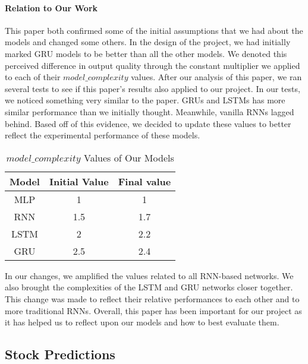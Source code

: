 \documentclass{article}
\begin{document}
    \paragraph{Relation to Our Work}

    This paper both confirmed some of the initial assumptions that we had about the models and changed some others.
    In the design of the project, we had initially marked GRU models to be better than all the other models.
    We denoted this perceived difference in output quality through the constant multiplier we applied to each of their
    $model\_complexity$ values.  After our analysis of this paper, we ran several tests to see if this paper's results
    also applied to our project.  In our tests, we noticed something very similar to the paper.  GRUs and LSTMs
    has more similar performance than we initially thought.  Meanwhile, vanilla RNNs lagged behind.  Based off of
    this evidence, we decided to update these values to better reflect the experimental performance of these models.

    \begin{table}[H]
        \begin{center}
            \caption{$model\_complexity$ Values of Our Models}
            \label{tab:modelComplexity}
            \begin{tabular}{c|c|c}
                \textbf{Model} & \textbf{Initial Value} & \textbf{Final value}\\
                \hline
                MLP & 1 & 1\\
                RNN & 1.5 & 1.7\\
                LSTM & 2 & 2.2\\
                GRU & 2.5 & 2.4
            \end{tabular}
        \end{center}
    \end{table}

    In our changes, we amplified the values related to all RNN-based networks.  We also brought the complexities
    of the LSTM and GRU networks closer together.  This change was made to reflect their relative performances to
    each other and to more traditional RNNs.  Overall, this paper has been important for our project as it has
    helped us to reflect upon our models and how to best evaluate them.

    \subsection{Stock Predictions}
\end{document}
